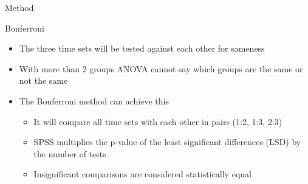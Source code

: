 \begin{frame}{Method}	
		\begin{block}{Bonferroni}
				\begin{itemize}
					\item The three time sets will be tested against each other for sameness
					\item With more than 2 groups ANOVA cannot say which groups are the same or not the same
					\item The Bonferroni method can achieve this
					\begin{itemize}
						\item It will compare all time sets with each other in pairs (1:2, 1:3, 2:3)
						\item SPSS multiplies the p-value of the least significant differences (LSD) by the number of tests
						\item Insignificant comparisons are considered statistically equal
					\end{itemize}
				\end{itemize}
			\end{block}
			
		\end{frame}